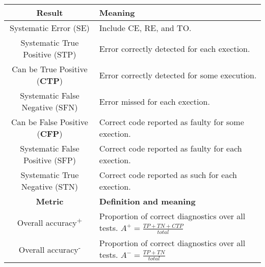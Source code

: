 \begin{tabular}{|c|l|}\hline
  \textbf{Result}&\textbf{Meaning}\\\hline
  Systematic Error (SE) & Include CE, RE, and TO.\\\hline\hline
  Systematic True Positive (STP)&Error correctly detected for each exection.\\\hline
  Can be True Positive (\textbf{CTP})&Error correctly detected for some execution.\\\hline
  Systematic False Negative (SFN)&Error missed for each exection.\\\hline
  Can be False Positive (\textbf{CFP})&Correct code reported as faulty for some exection.\\\hline
  Systematic False Positive (SFP)&Correct code reported as faulty for each exection.\\\hline
  Systematic True Negative (STN) &Correct code reported as such for each exection.\\\hline\hline
  \textbf{Metric}&\textbf{Definition and meaning}\\\hline
  Overall accuracy\textsuperscript{+}&\multirow{1.3}{*}{Proportion of correct diagnostics over all tests. $A^+=\frac{TP+TN+CTP}{total}$}\\[4pt]\hline
  Overall accuracy\textsuperscript{-}&\multirow{1.3}{*}{Proportion of correct diagnostics over all tests. $A^-=\frac{TP+TN}{total}$}\\[4pt]\hline

\end{tabular}
